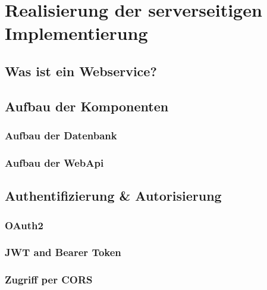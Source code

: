 \chapter{Realisierung der serverseitigen Implementierung}
\label{cha:server-impl}

\section{Was ist ein Webservice?}
\label{sec:definition-webservice}

\section{Aufbau der Komponenten}
\label{sec:aufbau-Komponenten}

\subsection{Aufbau der Datenbank}
\label{ssec:aufbau-server-db}

\subsection{Aufbau der WebApi}
\label{ssec:aufbau-webapi}

\section{Authentifizierung \& Autorisierung}
\label{sec:server-authorisierung}

\subsection{OAuth2}
\label{ssec:oauth2}

\subsection{JWT and Bearer Token}
\label{ssec:jwt-bearer}

\subsection{Zugriff per CORS}
\label{ssec:cors}